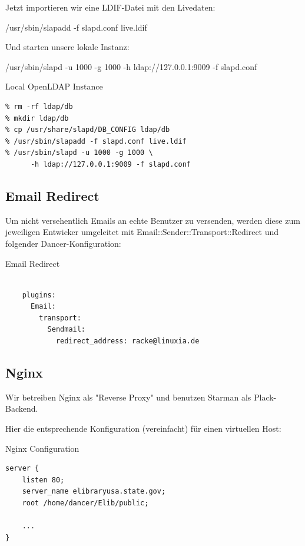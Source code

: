 Jetzt importieren wir eine LDIF-Datei mit den Livedaten:

    /usr/sbin/slapadd -f slapd.conf live.ldif

Und starten unsere lokale Instanz:

    /usr/sbin/slapd -u 1000 -g 1000 -h ldap://127.0.0.1:9009 -f slapd.conf

\begin{frame}[fragile]{Local OpenLDAP Instance}
\begin{lstlisting}
% rm -rf ldap/db
% mkdir ldap/db
% cp /usr/share/slapd/DB_CONFIG ldap/db
% /usr/sbin/slapadd -f slapd.conf live.ldif
% /usr/sbin/slapd -u 1000 -g 1000 \
      -h ldap://127.0.0.1:9009 -f slapd.conf
\end{lstlisting}
\end{frame}

\subsection{Email Redirect}

Um nicht versehentlich Emails an echte Benutzer zu versenden,
werden diese zum jeweiligen Entwicker umgeleitet mit
Email::Sender::Transport::Redirect und folgender
Dancer-Konfiguration:

\begin{frame}[fragile]{Email Redirect}
\begin{lstlisting}

    plugins:
      Email:
        transport:
          Sendmail:
            redirect_address: racke@linuxia.de

\end{lstlisting}
\end{frame}

\subsection{Nginx}
    
Wir betreiben Nginx als "Reverse Proxy" und benutzen Starman als
Plack-Backend.

Hier die entsprechende Konfiguration (vereinfacht) für einen virtuellen
Host:

\begin{frame}[fragile]{Nginx Configuration}
\begin{lstlisting}
server {
    listen 80;
    server_name elibraryusa.state.gov;
    root /home/dancer/Elib/public;

    ...
}
\end{lstlisting}
\end{frame}


